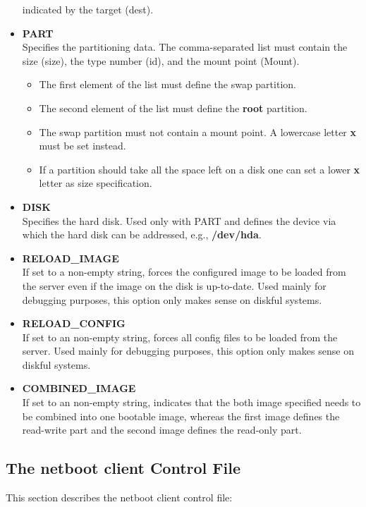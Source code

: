 \begin{itemize}
		indicated by the target (dest).
	\item \textbf{PART}\\
		Specifies the partitioning data. The comma-separated list
		must contain the size (size), the type number (id), and the
		mount point (Mount).
		\begin{itemize}
			\item The first element of the list must define the swap
                  partition.
            \item The second element of the list must define the
                  \textbf{root} partition.
	        \item The swap partition must not contain a mount point.
                  A lowercase letter \textbf{x} must be set instead.
            \item If a partition should take all the space left on
                  a disk one can set a lower \textbf{x} letter as
                  size specification.
		\end{itemize}
	\item \textbf{DISK}\\
		Specifies the hard disk. Used only with PART and defines
		the device via which the hard disk can be addressed,
		e.g., \textbf{/dev/hda}.
	\item \textbf{RELOAD\_IMAGE}\\
		If set to a non-empty string, forces the configured
		image to be loaded from the server even if the image on
		the disk is up-to-date. Used mainly for debugging
		purposes, this option only makes sense on diskful
		systems.
	\item \textbf{RELOAD\_CONFIG}\\
		If set to an non-empty string, forces all config files
		to be loaded from the server. Used mainly for debugging
		purposes, this option only makes sense on diskful
		systems.
	\item \textbf{COMBINED\_IMAGE}\\
        If set to an non-empty string, indicates that the both
        image specified needs to be combined into one bootable
        image, whereas the first image defines the read-write
        part and the second image defines the read-only part.
\end{itemize}


\subsection{The netboot client Control File}
\label{section:cntrlhw}
This section describes the netboot client control file:

